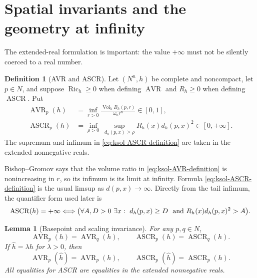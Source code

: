 \documentclass[10pt]{coll-l}
\newtheorem{lemma}[theorem]{Lemma}
\theoremstyle{definition}
\newtheorem{definition}[theorem]{Definition}
\theoremstyle{remark}
\numberwithin{section}{chapter}
\numberwithin{equation}{chapter}
\newcommand{\ASCR}{\operatorname{ASCR}}
\newcommand{\AVR}{\operatorname{AVR}}
\newcommand{\Ric}{\operatorname{Ric}}
\newcommand{\Vol}{\operatorname{Vol}}
\begin{document}
\section{Spatial invariants and the geometry at infinity}
\label{sec:ksol-spatial-infinity}

The extended-real formulation is important: the value $+\infty$ must not be
silently coerced to a real number.

\begin{definition}[AVR and ASCR]
\label{def:ksol-AVR-ASCR}
Let $(N^n,h)$ be complete and noncompact, let $p\in N$, and suppose
$\Ric_h\geq0$ when defining $\AVR$ and $R_h\geq0$ when defining $\ASCR$.
Put
\begin{align}
 \AVR_p(h)
   &=\inf_{r>0}\frac{\Vol_hB_h(p,r)}{\omega_n r^n}
     \in[0,1],                                          \label{eq:ksol-AVR-definition}\\
 \ASCR_p(h)
   &=\inf_{\rho>0}\ \sup_{d_h(p,x)\geq\rho}
           R_h(x)d_h(p,x)^2
     \in[0,+\infty].                                   \label{eq:ksol-ASCR-definition}
\end{align}
The supremum and infimum in \eqref{eq:ksol-ASCR-definition} are taken in
the extended nonnegative reals.
\end{definition}

Bishop--Gromov says that the volume ratio in
\eqref{eq:ksol-AVR-definition} is nonincreasing in $r$, so its infimum is
its limit at infinity.  Formula \eqref{eq:ksol-ASCR-definition} is the usual
limsup as $d(p,x)\to\infty$.  Directly from the tail infimum, the quantifier
form used later is
\begin{equation}
 \ASCR(h)=+\infty
 \Longleftrightarrow
 \bigl(\forall A,D>0\ \exists x:\
       d_h(p,x)\geq D\ \hbox{ and }R_h(x)d_h(p,x)^2>A\bigr).    \label{eq:ksol-ASCR-quantifiers}
\end{equation}

\begin{lemma}[Basepoint and scaling invariance]
\label{lem:ksol-spatial-invariants-well-defined}
For any $p,q\in N$,
\begin{equation}
             \AVR_p(h)=\AVR_q(h),\qquad
             \ASCR_p(h)=\ASCR_q(h).                  \label{eq:ksol-basepoint-invariance}
\end{equation}
If $\widehat h=\lambda h$ for $\lambda>0$, then
\begin{equation}
             \AVR_p(\widehat h)=\AVR_p(h),\qquad
             \ASCR_p(\widehat h)=\ASCR_p(h).         \label{eq:ksol-invariant-scaling}
\end{equation}
All equalities for ASCR are equalities in the extended nonnegative reals.
\end{lemma}
\end{document}
